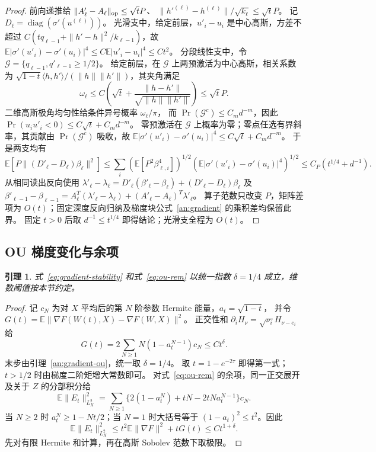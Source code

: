 \documentclass[a4paper]{tufte-handout}
\newtheorem{lemma}{引理}
\newcommand{\E}{\mathbb E}
\begin{document}
\begin{fullwidth}
\begin{proof}
前向递推给
$\|A'_\ell-A_\ell\|_{\rm op}\le\sqrt tP$、
$\|h'^{(\ell)}-h^{(\ell)}\|/\sqrt{k_\ell}\le\sqrt tP$。
记 $D_\ell=\operatorname{diag}(\sigma'(u^{(\ell)}))$。
光滑支中，给定前层，$u'_i-u_i$ 是中心高斯，方差不超过
$C(tq_{\ell-1}+\|h'-h\|^2/k_{\ell-1})$，故
$\E|\sigma'(u'_i)-\sigma'(u_i)|^4\le C\E|u'_i-u_i|^4\le Ct^2$。
分段线性支中，令 $\mathcal G=\{q_{\ell-1},q'_{\ell-1}\ge1/2\}$。
给定前层，在 $\mathcal G$ 上两预激活为中心高斯，相关系数为
$\sqrt{1-t}\langle h,h'\rangle/(\|h\|\|h'\|)$，其夹角满足
\[
 \omega_\ell\le C\left(\sqrt t+
 \frac{\|h-h'\|}{\sqrt{\|h\|\|h'\|}}\right)\le\sqrt tP.
\]
二维高斯极角均匀性给条件异号概率 $\omega_\ell/\pi$，
而 $\Pr(\mathcal G^c)\le C_md^{-m}$，因此
$\Pr(u_iu'_i<0)\le C\sqrt t+C_md^{-m}$。
零预激活在 $\mathcal G$ 上概率为零；零点任选有界斜率，其贡献由 $\Pr(\mathcal G^c)$ 吸收，故
$\E|\sigma'(u'_i)-\sigma'(u_i)|^4\le C\sqrt t+C_md^{-m}$。
于是两支均有
\[
 \E[P\|(D'_\ell-D_\ell)\beta_\ell\|^2]
 \le\sum_i(\E[P^2\beta_{\ell,i}^4])^{1/2}
       (\E|\sigma'(u'_i)-\sigma'(u_i)|^4)^{1/2}
 \le C_P(t^{1/4}+d^{-1}).
\]
从相同读出反向使用
$\lambda'_\ell-\lambda_\ell
 =D'_\ell(\beta'_\ell-\beta_\ell)+(D'_\ell-D_\ell)\beta_\ell$ 及
$\beta'_{\ell-1}-\beta_{\ell-1}
 =A_\ell^T(\lambda'_\ell-\lambda_\ell)+(A'_\ell-A_\ell)^T\lambda'_\ell$。
算子范数只改变 $P$，矩阵差项为 $O(t)$；固定深度反向归纳及梯度块公式~\eqref{an:gradient} 的乘积差均保留此界。
固定 $t>0$ 后取 $d^{-1}\le t^{1/4}$ 即得结论；光滑支全程为 $O(t)$。
\end{proof}

\subsection{OU 梯度变化与余项}
\begin{lemma}\label{an:ou}
式~\eqref{eq:gradient-stability} 和式~\eqref{eq:ou-rem} 以统一指数 $\delta=1/4$ 成立，维数阈值按本节约定。
\end{lemma}
\begin{proof}
记 $c_N$ 为对 $X$ 平均后的第 $N$ 阶参数 Hermite 能量，$a_t=\sqrt{1-t}$，
并令 $G(t)=\E\|\nabla F(W(t),X)-\nabla F(W,X)\|^2$。
正交性和 $\partial_iH_\nu=\sqrt{\nu_i}H_{\nu-e_i}$ 给
\[
 G(t)=2\sum_{N\ge1}N(1-a_t^{N-1})c_N\le Ct^\delta.
\]
末步由引理~\ref{an:gradient-ou}，统一取 $\delta=1/4$。
取 $t=1-e^{-2\tau}$ 即得第一式；
$t>1/2$ 时由梯度二阶矩增大常数即可。
对式~\eqref{eq:ou-rem} 的余项，同一正交展开及关于 $Z$ 的分部积分给
\[
 \E\|E_t\|_{L_X^2}^2=\sum_{N\ge1}\{2(1-a_t^N)+tN-2tNa_t^{N-1}\}c_N.
\]
当 $N\ge2$ 时 $a_t^N\ge1-Nt/2$；当 $N=1$ 时大括号等于
$(1-a_t)^2\le t^2$。因此
\begin{equation}\label{an:hermite}
 \E\|E_t\|_{L_X^2}^2\le t^2\E\|\nabla F\|^2+tG(t)\le Ct^{1+\delta}.
\end{equation}
先对有限 Hermite 和计算，再在高斯 Sobolev 范数下取极限。
\end{proof}


\end{fullwidth}
\end{document}
